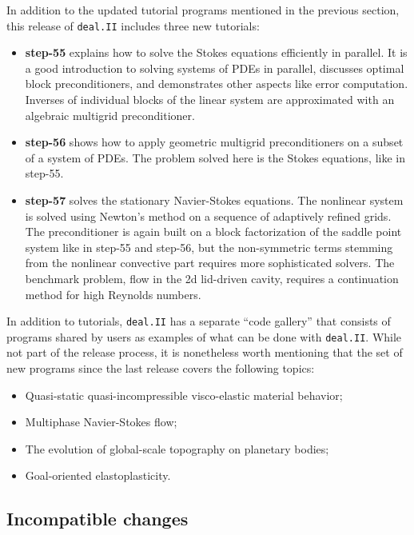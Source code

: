 \documentclass{ansarticle-preprint}
\newcommand{\specialword}[1]{\texttt{#1}}
\newcommand{\dealii}{{\specialword{deal.II}}}
\begin{document}
In addition to the updated tutorial programs mentioned in the previous
section, this release of \dealii{} includes three new tutorials:
\begin{itemize}
 \item {\bf step-55} explains how to solve the Stokes
 equations efficiently in parallel. It is a good introduction to solving
 systems of PDEs in parallel, discusses optimal block
 preconditioners, and demonstrates other aspects like error computation.
 Inverses of individual blocks of the linear system are approximated with an algebraic
 multigrid preconditioner.

 \item {\bf step-56} shows how to apply geometric multigrid
 preconditioners on a subset of a system of PDEs. The problem solved here is the
 Stokes equations, like in step-55.

 \item {\bf step-57} solves the stationary Navier-Stokes equations.
 The nonlinear system is solved using Newton's method on a sequence of adaptively refined
 grids. The preconditioner is again built on a block factorization of the saddle point
 system like in step-55 and step-56, but the non-symmetric terms stemming from the
 nonlinear convective part requires more sophisticated solvers. The benchmark problem,
 flow in the 2d lid-driven cavity, requires a continuation method for high Reynolds
 numbers.
 \end{itemize}

In addition to tutorials, \dealii{} has a separate ``code gallery'' that
consists of programs shared by users as examples of what can be
done with \dealii{}. While not part of the release process, it is nonetheless
worth mentioning that the set of new programs since the last release covers
the following topics:
  \begin{itemize}
    \item Quasi-static quasi-incompressible visco-elastic material behavior;
    \item Multiphase Navier-Stokes flow;
    \item The evolution of global-scale topography on planetary bodies;
    \item Goal-oriented elastoplasticity.
  \end{itemize}


\subsection{Incompatible changes}
\end{document}
